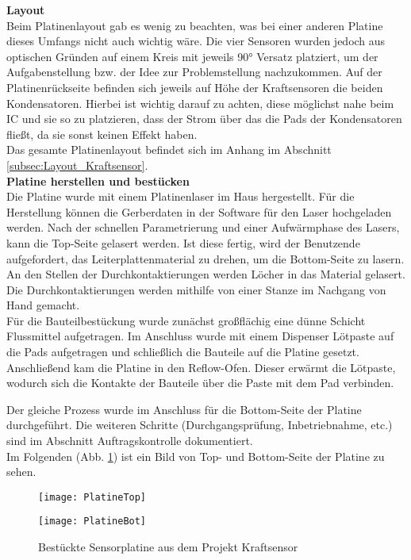 \documentclass[
	letterpaper, %
	10pt, %
]{CSUniSchoolLabReport}
\begin{document}
\begin{spacing}{1.6}
\textbf{Layout\\}
Beim Platinenlayout gab es wenig zu beachten, was bei einer anderen Platine dieses Umfangs nicht auch wichtig wäre. Die vier Sensoren wurden jedoch aus optischen Gründen auf einem Kreis mit jeweils 90° Versatz platziert, um der Aufgabenstellung bzw. der Idee zur Problemstellung nachzukommen. Auf der Platinenrückseite befinden sich jeweils auf Höhe der Kraftsensoren die beiden Kondensatoren. Hierbei ist wichtig darauf zu achten, diese möglichst nahe beim IC und sie so zu platzieren, dass der Strom über das die Pads der Kondensatoren fließt, da sie sonst keinen Effekt haben.\\
Das gesamte Platinenlayout befindet sich im Anhang im Abschnitt \ref{subsec:Layout_Kraftsensor}.\\

\textbf{Platine herstellen und bestücken\\}
Die Platine wurde mit einem Platinenlaser im Haus hergestellt. Für die Herstellung können die Gerberdaten in der Software für den Laser hochgeladen werden. Nach der schnellen Parametrierung und einer Aufwärmphase des Lasers, kann die Top-Seite gelasert werden. Ist diese fertig, wird der Benutzende aufgefordert, das Leiterplattenmaterial zu drehen, um die Bottom-Seite zu lasern. An den Stellen der Durchkontaktierungen werden Löcher in das Material gelasert. Die Durchkontaktierungen werden mithilfe von einer Stanze im Nachgang von Hand gemacht.\\

Für die Bauteilbestückung wurde zunächst großflächig eine dünne Schicht Flussmittel aufgetragen. Im Anschluss wurde mit einem Dispenser Lötpaste auf die Pads aufgetragen und schließlich die Bauteile auf die Platine gesetzt.\\

Anschließend kam die Platine in den Reflow-Ofen. Dieser erwärmt die Lötpaste, wodurch sich die Kontakte der Bauteile über die Paste mit dem Pad verbinden.

Der gleiche Prozess wurde im Anschluss für die Bottom-Seite der Platine durchgeführt. Die weiteren Schritte (Durchgangsprüfung, Inbetriebnahme, etc.) \: sind \: im \: Abschnitt \glqq Auftragskontrolle\grqq $ $ dokumentiert.\\

Im Folgenden (Abb. \ref{fig:Sensorplatine}) ist ein Bild von Top- und Bottom-Seite der Platine zu sehen.\\
\begin{figure}[H]
\begin{minipage}[t]{0.5\textwidth}
    \centering
    \texttt{[image: PlatineTop]}
\end{minipage}
\begin{minipage}[t]{0.5\textwidth}
    \centering
    \texttt{[image: PlatineBot]}
\end{minipage}
    \caption{Bestückte Sensorplatine aus dem Projekt \glqq Kraftsensor\grqq}
    \label{fig:Sensorplatine}
\end{figure}



\end{spacing}
\end{document}

